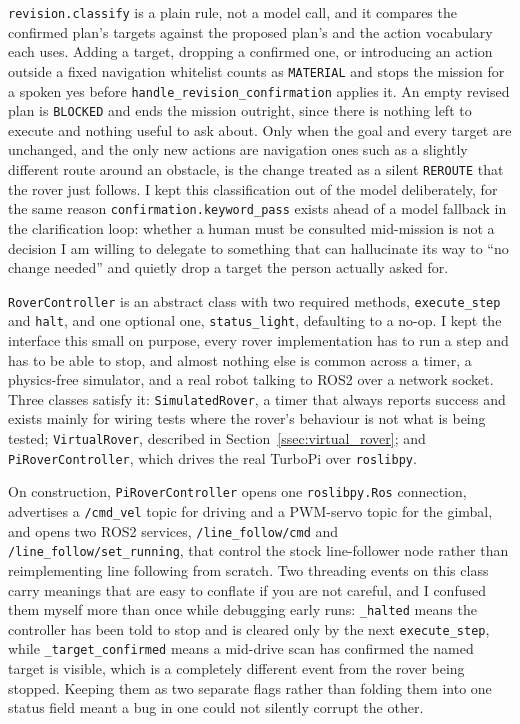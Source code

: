 \texttt{revision.classify} is a plain rule, not a model call, and it
compares the confirmed plan's targets against the proposed plan's and the
action vocabulary each uses. Adding a target, dropping a confirmed one, or
introducing an action outside a fixed navigation whitelist counts as
\texttt{MATERIAL} and stops the mission for a spoken yes before
\texttt{handle\_revision\_confirmation} applies it. An empty revised plan is
\texttt{BLOCKED} and ends the mission outright, since there is nothing left
to execute and nothing useful to ask about. Only when the goal and every
target are unchanged, and the only new actions are navigation ones such as
a slightly different route around an obstacle, is the change treated as a
silent \texttt{REROUTE} that the rover just follows. I kept this
classification out of the model deliberately, for the same reason
\texttt{confirmation.keyword\_pass} exists ahead of a model fallback in the
clarification loop: whether a human must be consulted mid-mission is not a
decision I am willing to delegate to something that can hallucinate its way
to ``no change needed'' and quietly drop a target the person actually
asked for.

\label{sec:rover_client}

\label{ssec:pi_rover}

\texttt{RoverController} is an abstract class with two required methods,
\texttt{execute\_step} and \texttt{halt}, and one optional one,
\texttt{status\_light}, defaulting to a no-op. I kept the interface this
small on purpose, every rover implementation has to run a step and has to
be able to stop, and almost nothing else is common across a timer, a
physics-free simulator, and a real robot talking to ROS2 over a network
socket. Three classes satisfy it: \texttt{SimulatedRover}, a timer that
always reports success and exists mainly for wiring tests where the rover's
behaviour is not what is being tested; \texttt{VirtualRover}, described in
Section~\ref{ssec:virtual_rover}; and \texttt{PiRoverController}, which
drives the real TurboPi over \texttt{roslibpy}.

On construction, \texttt{PiRoverController} opens one
\texttt{roslibpy.Ros} connection, advertises a \texttt{/cmd\_vel} topic for
driving and a PWM-servo topic for the gimbal, and opens two ROS2 services,
\texttt{/line\_follow/cmd} and \texttt{/line\_follow/set\_running}, that
control the stock line-follower node rather than reimplementing line
following from scratch. Two threading events on this class carry meanings
that are easy to conflate if you are not careful, and I confused them
myself more than once while debugging early runs: \texttt{\_halted} means
the controller has been told to stop and is cleared only by the next
\texttt{execute\_step}, while \texttt{\_target\_confirmed} means a
mid-drive scan has confirmed the named target is visible, which is a
completely different event from the rover being stopped. Keeping them as
two separate flags rather than folding them into one status field meant a
bug in one could not silently corrupt the other.

